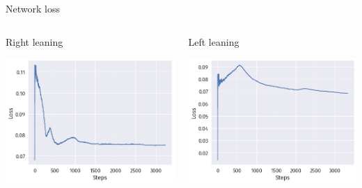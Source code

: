 \documentclass[bigger]{beamer}
\begin{document}
\begin{frame}[label={sec:orga8c2deb}]{Network loss}
\begin{columns}
\begin{column}{0.5\columnwidth}
\centering
Right leaning
\begin{center}
\includegraphics[width=\columnwidth]{img/DRL-loss.png}
\end{center}
\end{column}
\begin{column}{0.5\columnwidth}
\centering
Left leaning
\begin{center}
\includegraphics[width=\columnwidth]{img/DRL-loss2.png}
\end{center}
\end{column}
\end{columns}
\end{frame}
\end{document}
